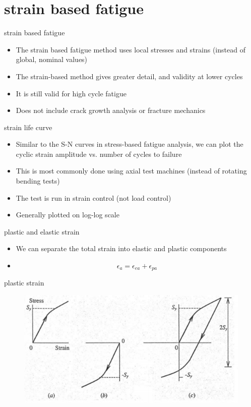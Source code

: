 \documentclass[10pt]{beamer}
\begin{document}
\section{strain based fatigue}

\begin{frame}{strain based fatigue}
	\begin{itemize}[<+->]
		\item The strain based fatigue method uses local stresses and strains (instead of global, nominal values)
		\item The strain-based method gives greater detail, and validity at lower cycles
		\item It is still valid for high cycle fatigue
		\item Does not include crack growth analysis or fracture mechanics
	\end{itemize}
\end{frame}

\begin{frame}{strain life curve}
	\begin{itemize}[<+->]
		\item Similar to the S-N curves in stress-based fatigue analysis, we can plot the cyclic strain amplitude vs. number of cycles to failure
		\item This is most commonly done using axial test machines (instead of rotating bending tests)
		\item The test is run in strain control (not load control)
		\item Generally plotted on log-log scale
	\end{itemize}
\end{frame}

\begin{frame}{plastic and elastic strain}
	\begin{itemize}[<+->]
		\item We can separate the total strain into elastic and plastic components
		\item[] \begin{equation}
		\epsilon_a = \epsilon_{ea} + \epsilon_{pa}
		\end{equation}
	\end{itemize}
\end{frame}

\begin{frame}{plastic strain}
	\begin{figure}
	\centering
	\includegraphics[width=0.7\linewidth]{"../Figures/plastic_strain"}
	\label{fig:plasticstrain}
	\end{figure}
\end{frame}
\end{document}
